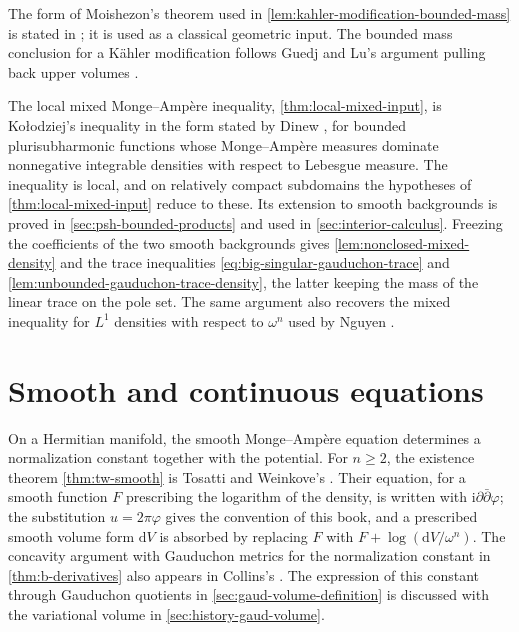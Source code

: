 The form of Moishezon's theorem used in \cref{lem:kahler-modification-bounded-mass} is stated in \cite[Introduction, p.~1332]{Moi67}; it is used as a classical geometric input. The bounded mass conclusion for a K\"ahler modification follows Guedj and Lu's argument pulling back upper volumes \cite[Lemma 3.6]{GL22}.

The local mixed Monge--Amp\`ere inequality, \cref{thm:local-mixed-input}, is Ko{\l}odziej's inequality in the form stated by Dinew \cite[Theorem~1.2, p.~2]{Dinew09}, for bounded plurisubharmonic functions whose Monge--Amp\`ere measures dominate nonnegative integrable densities with respect to Lebesgue measure. The inequality is local, and on relatively compact subdomains the hypotheses of \cref{thm:local-mixed-input} reduce to these. Its extension to smooth backgrounds is proved in \cref{sec:psh-bounded-products} and used in \cref{sec:interior-calculus}. Freezing the coefficients of the two smooth backgrounds gives \cref{lem:nonclosed-mixed-density} and the trace inequalities \eqref{eq:big-singular-gauduchon-trace} and \cref{lem:unbounded-gauduchon-trace-density}, the latter keeping the mass of the linear trace on the pole set. The same argument also recovers the mixed inequality for $L^1$ densities with respect to $\omega^n$ used by Nguyen \cite[Lemma~1.9, p.~255]{Nguyen16}.

\section{Smooth and continuous equations}
\label{sec:history-smooth-equations}

On a Hermitian manifold, the smooth Monge--Amp\`ere equation determines a normalization constant together with the potential. For $n\geq2$, the existence theorem \cref{thm:tw-smooth} is Tosatti and Weinkove's \cite[Corollary 1]{TW10}. Their equation, for a smooth function $F$ prescribing the logarithm of the density, is written with $\mathrm i\partial\bar\partial\varphi$; the substitution $u=2\pi\varphi$ gives the convention of this book, and a prescribed smooth volume form $\mathrm dV$ is absorbed by replacing $F$ with $F+\log(\mathrm dV/\omega^n)$. The concavity argument with Gauduchon metrics for the normalization constant in \cref{thm:b-derivatives} also appears in Collins's \cite[Theorem~2.13 and its second proof, pp.~1068--1069]{Collins21}. The expression of this constant through Gauduchon quotients in \cref{sec:gaud-volume-definition} is discussed with the variational volume in \cref{sec:history-gaud-volume}.

